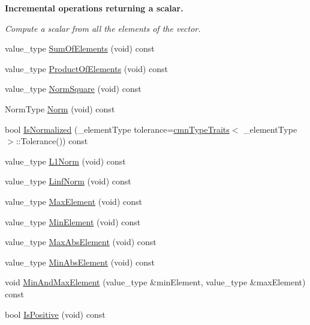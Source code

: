 \begin{Indent}{\bf Incremental operations returning a scalar.}\par
{\em Compute a scalar from all the elements of the vector. }\begin{DoxyCompactItemize}
\item 
value\-\_\-type \hyperlink{classvct_fixed_size_const_vector_base_ac511673c2790b811713df7728f65b5da}{Sum\-Of\-Elements} (void) const 
\item 
value\-\_\-type \hyperlink{classvct_fixed_size_const_vector_base_a826fd6b5c97c074d6c0484cc107bb31e}{Product\-Of\-Elements} (void) const 
\item 
value\-\_\-type \hyperlink{classvct_fixed_size_const_vector_base_a5a865a5e5eceae4e781620f83efa54b4}{Norm\-Square} (void) const 
\item 
Norm\-Type \hyperlink{classvct_fixed_size_const_vector_base_a43f0c7b075985c9ad43df78aa3af48cf}{Norm} (void) const 
\item 
bool \hyperlink{classvct_fixed_size_const_vector_base_a137a8c27c0ac4c69d82603d8ccc57ff5}{Is\-Normalized} (\-\_\-element\-Type tolerance=\hyperlink{classcmn_type_traits}{cmn\-Type\-Traits}$<$ \-\_\-element\-Type $>$\-::Tolerance()) const 
\item 
value\-\_\-type \hyperlink{classvct_fixed_size_const_vector_base_a24e2d1c86fbfa08de36508830bcd18a5}{L1\-Norm} (void) const 
\item 
value\-\_\-type \hyperlink{classvct_fixed_size_const_vector_base_a6cc25d43b07b0e85cebf697f4473013a}{Linf\-Norm} (void) const 
\item 
value\-\_\-type \hyperlink{classvct_fixed_size_const_vector_base_ae8a9354f4981167ad4b32ebc46718075}{Max\-Element} (void) const 
\item 
value\-\_\-type \hyperlink{classvct_fixed_size_const_vector_base_a3f26bcaaecf71aaf2e4150a1cba75310}{Min\-Element} (void) const 
\item 
value\-\_\-type \hyperlink{classvct_fixed_size_const_vector_base_adec6fb220a9ea13e9fb0ecae8ad1785b}{Max\-Abs\-Element} (void) const 
\item 
value\-\_\-type \hyperlink{classvct_fixed_size_const_vector_base_a841b82fc4780be7d5c992b9d75f4ccbc}{Min\-Abs\-Element} (void) const 
\item 
void \hyperlink{classvct_fixed_size_const_vector_base_a53a918269efce35fdb84addc8d694b2d}{Min\-And\-Max\-Element} (value\-\_\-type \&min\-Element, value\-\_\-type \&max\-Element) const 
\item 
bool \hyperlink{classvct_fixed_size_const_vector_base_ada9b5030f7256d8ffb7aaf314db06e92}{Is\-Positive} (void) const 

\end{DoxyCompactItemize}
\end{Indent}
